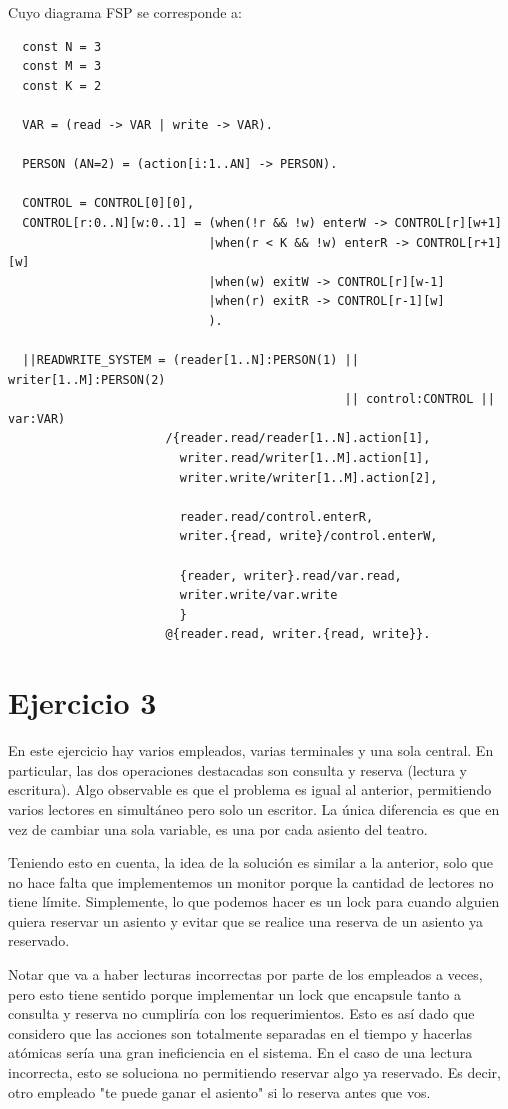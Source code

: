 \documentclass{article}
\begin{document}
Cuyo diagrama FSP se corresponde a:
\begin{verbatim}
  const N = 3 
  const M = 3 
  const K = 2 

  VAR = (read -> VAR | write -> VAR).

  PERSON (AN=2) = (action[i:1..AN] -> PERSON).

  CONTROL = CONTROL[0][0],
  CONTROL[r:0..N][w:0..1] = (when(!r && !w) enterW -> CONTROL[r][w+1]
                            |when(r < K && !w) enterR -> CONTROL[r+1][w]
                            |when(w) exitW -> CONTROL[r][w-1]
                            |when(r) exitR -> CONTROL[r-1][w]
                            ).

  ||READWRITE_SYSTEM = (reader[1..N]:PERSON(1) || writer[1..M]:PERSON(2)
                                               || control:CONTROL || var:VAR)
                      /{reader.read/reader[1..N].action[1],
                        writer.read/writer[1..M].action[1],
                        writer.write/writer[1..M].action[2],

                        reader.read/control.enterR,
                        writer.{read, write}/control.enterW,

                        {reader, writer}.read/var.read,
                        writer.write/var.write
                        }
                      @{reader.read, writer.{read, write}}.
\end{verbatim}

\section*{Ejercicio 3}
En este ejercicio hay varios empleados, varias terminales y una sola central.
En particular, las dos operaciones destacadas son consulta y reserva (lectura y escritura).
Algo observable es que el problema es igual al anterior, permitiendo varios lectores en simultáneo pero solo un escritor.
La única diferencia es que en vez de cambiar una sola variable, es una por cada asiento del teatro.

Teniendo esto en cuenta, la idea de la solución es similar a la anterior, solo que no hace falta que implementemos un monitor porque la cantidad de lectores no tiene límite.
Simplemente, lo que podemos hacer es un lock para cuando alguien quiera reservar un asiento y evitar que se realice una reserva de un asiento ya reservado.

Notar que va a haber lecturas incorrectas por parte de los empleados a veces, pero esto tiene sentido porque implementar un lock que encapsule tanto a consulta y reserva no cumpliría con los requerimientos.
Esto es así dado que considero que las acciones son totalmente separadas en el tiempo y hacerlas atómicas sería una gran ineficiencia en el sistema.
En el caso de una lectura incorrecta, esto se soluciona no permitiendo reservar algo ya reservado.
Es decir, otro empleado "te puede ganar el asiento" si lo reserva antes que vos.
\end{document}

